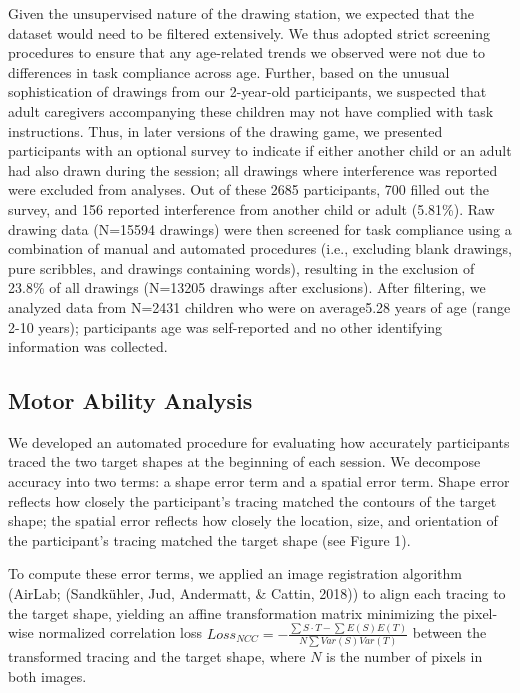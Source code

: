 \documentclass[10pt, letterpaper]{article}
\begin{document}
Given the unsupervised nature of the drawing station, we expected that
the dataset would need to be filtered extensively. We thus adopted
strict screening procedures to ensure that any age-related trends we
observed were not due to differences in task compliance across age.
Further, based on the unusual sophistication of drawings from our
2-year-old participants, we suspected that adult caregivers accompanying
these children may not have complied with task instructions. Thus, in
later versions of the drawing game, we presented participants with an
optional survey to indicate if either another child or an adult had also
drawn during the session; all drawings where interference was reported
were excluded from analyses. Out of these 2685 participants, 700 filled
out the survey, and 156 reported interference from another child or
adult (5.81\%). Raw drawing data (N=15594 drawings) were then screened
for task compliance using a combination of manual and automated
procedures (i.e., excluding blank drawings, pure scribbles, and drawings
containing words), resulting in the exclusion of 23.8\% of all drawings
(N=13205 drawings after exclusions). After filtering, we analyzed data
from N=2431 children who were on average5.28 years of age (range 2-10
years); participants age was self-reported and no other identifying
information was collected.

\subsection{Motor Ability Analysis}\label{motor-ability-analysis}

We developed an automated procedure for evaluating how accurately
participants traced the two target shapes at the beginning of each
session. We decompose accuracy into two terms: a shape error term and a
spatial error term. Shape error reflects how closely the participant's
tracing matched the contours of the target shape; the spatial error
reflects how closely the location, size, and orientation of the
participant's tracing matched the target shape (see Figure 1).

To compute these error terms, we applied an image registration algorithm
(AirLab; (Sandkühler, Jud, Andermatt, \& Cattin, 2018)) to align each
tracing to the target shape, yielding an affine transformation matrix
minimizing the pixel-wise normalized correlation loss
\(Loss_{NCC} = - \frac{\sum S \cdot T - \sum E(S) E(T)}{N \sum Var(S) Var(T)}\)
between the transformed tracing and the target shape, where \(N\) is the
number of pixels in both images.
\end{document}

